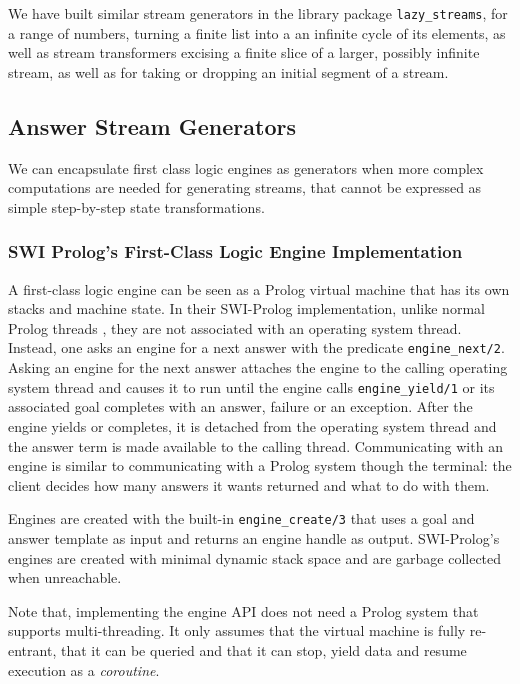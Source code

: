 \documentclass{new_tlp}
\begin{document}
We have built similar stream generators in the library package 
{\tt lazy\_streams}, for a range of numbers, turning a finite list into
a an infinite cycle of its elements, as well as stream 
transformers excising a finite slice of a larger, possibly infinite stream,
as well as for taking or dropping an initial segment of a stream.

\subsection{Answer Stream Generators}

We can encapsulate first class logic engines as generators  when more
complex computations are needed for generating streams, that  cannot be
expressed as simple step-by-step state transformations.

\subsubsection{SWI Prolog's First-Class Logic Engine Implementation}

A first-class logic engine \cite{tarau:cl2000,bp2011} can be seen as a Prolog
virtual machine that has its own stacks and machine state.  In their SWI-Prolog
implementation, unlike normal Prolog threads \cite{swi,swi_threads}, they are
not associated with an operating system thread. Instead, one asks an engine for
a next answer with the predicate {\tt engine\_next/2}. Asking an engine for the
next answer attaches the engine to the calling operating system thread and
causes it to run until the engine calls {\tt engine\_yield/1} or its associated
goal completes with an answer, failure or an exception. After the engine yields
or completes, it is detached from the operating system thread and the answer
term is made available to the calling thread. Communicating with an engine is
similar to communicating with a Prolog system though the terminal: the client
decides how many answers it wants returned and what to do with them.  

Engines are created with the built-in {\tt engine\_create/3} that uses a goal
and answer template as input and returns an engine handle as output.
SWI-Prolog's engines are created with minimal dynamic stack space and are
garbage collected when unreachable.

Note that, implementing the engine API does not need  a Prolog system that
supports multi-threading. It only assumes that the virtual machine is fully
re-entrant, that it can be queried and that it can stop, yield data and resume
execution as a {\em coroutine}.
\end{document}
